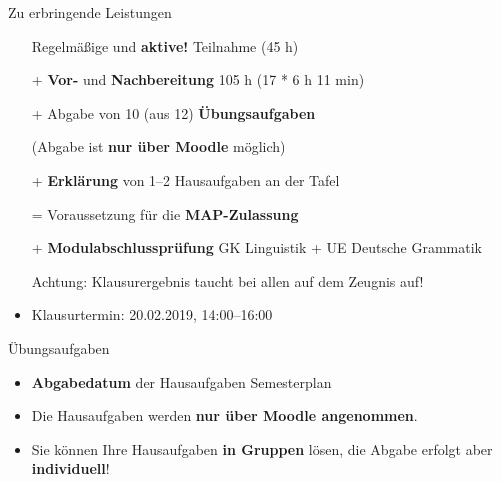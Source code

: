 \begin{frame}{Zu erbringende Leistungen}

	\begin{itemize}
	\item[] Regelmäßige und \textbf{aktive!} Teilnahme (45 h)
	
    \item[+] \textbf{Vor-} und \textbf{Nachbereitung} 105 h (17 * 6 h 11 min)
	
	\item[+] Abgabe von 10 (aus 12) \textbf{Übungsaufgaben }
	
	(Abgabe ist \textbf{nur über Moodle} möglich)
	
	\item[+] \textbf{Erklärung} von 1--2 Hausaufgaben an der Tafel 
	
	\item[=] Voraussetzung für die \textbf{MAP-Zulassung}

\pause

	\item[+] \textbf{Modulabschlussprüfung} \ras GK Linguistik + UE Deutsche Grammatik

	Achtung: Klausurergebnis taucht bei allen auf dem Zeugnis auf!

	\item[]
	\item Klausurtermin: 20.02.2019, 14:00--16:00
              
	\end{itemize}
	
\end{frame}



\begin{frame}{Übungsaufgaben}

\begin{itemize}
	\item \textbf{Abgabedatum} der Hausaufgaben \ras Semesterplan
	
	\item Die Hausaufgaben werden \textbf{nur über Moodle angenommen}.
	
	 \item Sie können Ihre Hausaufgaben \textbf{in Gruppen} lösen, die Abgabe erfolgt aber \textbf{individuell}!
\end{itemize}
\end{frame}

